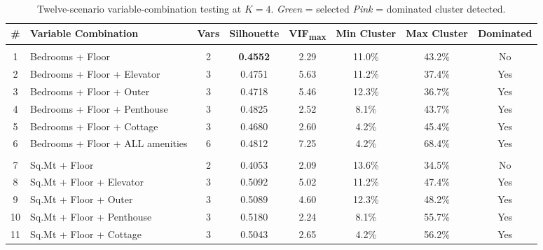 \documentclass[10pt,a4paper,twocolumn]{article}
\begin{document}
\begin{table}[H]
\centering
\caption{Twelve-scenario variable-combination testing at $K\!=\!4$.
\textit{Green} = selected \textbar{} \textit{Pink} = dominated cluster detected.}
\label{tab:scenarios}
\small
\setlength{\tabcolsep}{5pt}
\begin{tabularx}{\textwidth}{@{} c X c c c c c c @{}}
\toprule
\textbf{\#} & \textbf{Variable Combination} & \textbf{Vars} &
\textbf{Silhouette} & \textbf{VIF\textsubscript{max}} &
\textbf{Min Cluster} & \textbf{Max Cluster} & \textbf{Dominated} \\
\midrule
\rowcolor{lightgray}
\multicolumn{8}{@{}l}{\textit{\small Bedrooms-based combinations}} \\
\rowcolor{rowgreen}
1 & Bedrooms + Floor                 & 2 & \textbf{0.4552} & 2.29 & 11.0\% & 43.2\% & \textcolor{passgreen}{No}  \\
\rowcolor{rowpink}
2 & Bedrooms + Floor + Elevator      & 3 & 0.4751 & 5.63 & 11.2\% & 37.4\% & \textcolor{accentred}{Yes} \\
\rowcolor{rowpink}
3 & Bedrooms + Floor + Outer         & 3 & 0.4718 & 5.46 & 12.3\% & 36.7\% & \textcolor{accentred}{Yes} \\
\rowcolor{rowpink}
4 & Bedrooms + Floor + Penthouse     & 3 & 0.4825 & 2.52 &  8.1\% & 43.7\% & \textcolor{accentred}{Yes} \\
\rowcolor{rowpink}
5 & Bedrooms + Floor + Cottage       & 3 & 0.4680 & 2.60 &  4.2\% & 45.4\% & \textcolor{accentred}{Yes} \\
\rowcolor{rowpink}
6 & Bedrooms + Floor + ALL amenities & 6 & 0.4812 & 7.25 &  4.2\% & 68.4\% & \textcolor{accentred}{Yes} \\
\midrule
\rowcolor{lightgray}
\multicolumn{8}{@{}l}{\textit{\small Sq.Mt-based combinations}} \\
7  & Sq.Mt + Floor                    & 2 & 0.4053 & 2.09 & 13.6\% & 34.5\% & \textcolor{passgreen}{No}  \\
\rowcolor{rowpink}
8  & Sq.Mt + Floor + Elevator         & 3 & 0.5092 & 5.02 & 11.2\% & 47.4\% & \textcolor{accentred}{Yes} \\
\rowcolor{rowpink}
9  & Sq.Mt + Floor + Outer            & 3 & 0.5089 & 4.60 & 12.3\% & 48.2\% & \textcolor{accentred}{Yes} \\
\rowcolor{rowpink}
10 & Sq.Mt + Floor + Penthouse        & 3 & 0.5180 & 2.24 &  8.1\% & 55.7\% & \textcolor{accentred}{Yes} \\
\rowcolor{rowpink}
11 & Sq.Mt + Floor + Cottage          & 3 & 0.5043 & 2.65 &  4.2\% & 56.2\% & \textcolor{accentred}{Yes} \\

\end{tabularx}
\end{table}
\end{document}
